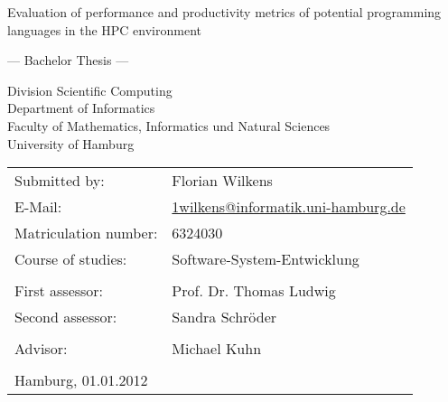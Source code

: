 \documentclass[
	12pt,
	a4paper,
	BCOR10mm,
	DIV14,
	listof=totoc,
	bibliography=totoc,
	headsepline
]{scrreprt}
\begin{document}
\begin{titlepage}
	\begin{center}
		{\titlefont\huge ﻿Evaluation of performance and productivity metrics of
			potential programming languages in the HPC environment \par}

		\bigskip
		\bigskip

		{\titlefont\Large --- Bachelor Thesis ---\par}

		\bigskip
		\bigskip

		{\large Division Scientific Computing \\
		Department of Informatics\\
		Faculty of Mathematics, Informatics und Natural Sciences\\
		University of Hamburg\par}
	\end{center}

	\vfill

	{\large \begin{tabular}{ll}
		Submitted by: & Florian Wilkens \\
		E-Mail: & \href{mailto:1wilkens@informatik.uni-hamburg.de}
			{1wilkens@informatik.uni-hamburg.de} \\
		Matriculation number: & 6324030 \\
		Course of studies: & Software-System-Entwicklung \\
		\\
		First assessor: & Prof. Dr. Thomas Ludwig \\
		Second assessor: & Sandra Schröder \\ \\
		Advisor: & Michael Kuhn \\
		\\
		Hamburg, 01.01.2012
	\end{tabular}\par}
\end{titlepage}



\tableofcontents 				  %






\end{document}
